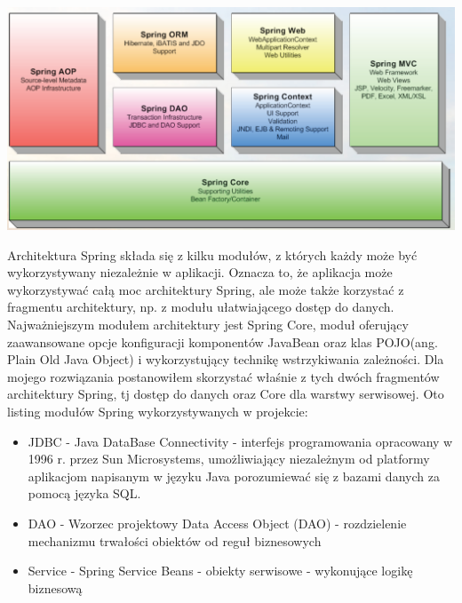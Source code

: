 \vspace*{0.1cm}
\includegraphics[scale=0.31]{images/spring-modules}
\vspace*{0.1cm}

Architektura Spring składa się z kilku modułów, z których każdy może być wykorzystywany niezależnie w aplikacji. Oznacza to, że aplikacja może wykorzystywać całą moc architektury Spring, ale może także korzystać z fragmentu architektury, np. z modułu ułatwiającego dostęp do danych. Najważniejszym modułem architektury jest Spring Core, moduł oferujący zaawansowane opcje konfiguracji komponentów JavaBean oraz klas POJO(ang. Plain Old Java Object) i wykorzystujący technikę wstrzykiwania zależności.
Dla mojego rozwiązania postanowiłem skorzystać właśnie z tych dwóch fragmentów architektury Spring, tj dostęp do danych oraz Core dla warstwy serwisowej. Oto listing modułów Spring wykorzystywanych w projekcie:
\begin{itemize}
 \item JDBC - Java DataBase Connectivity - interfejs programowania opracowany w 1996 r. przez Sun Microsystems, umożliwiający niezależnym od platformy aplikacjom napisanym w języku Java porozumiewać się z bazami danych za pomocą języka SQL.
 \item DAO - Wzorzec projektowy Data Access Object (DAO) - rozdzielenie mechanizmu trwałości obiektów od reguł biznesowych
 \item Service - Spring Service Beans - obiekty serwisowe - wykonujące logikę biznesową
\end{itemize}

